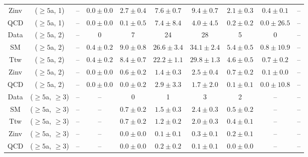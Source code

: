 \begin{table}[h!]
{\begin{tabular}{cccccccccc}
	Zinv & ($\ge5$a, 1) & -- & $0.0\pm 0.0$ & $2.7\pm 0.4$ & $7.6\pm 0.7$ & $9.4\pm 0.7$ & $2.1\pm 0.3$ & $0.4\pm 0.1$ & -- \\[0.5ex] 
	QCD & ($\ge5$a, 1) & -- & $0.0\pm 0.0$ & $0.1\pm 0.5$ & $7.4\pm 8.4$ & $4.0\pm 4.5$ & $0.2\pm 0.2$ & $0.0\pm 26.5$ & -- \\[0.5ex] 
	Data & ($\ge5$a, 2) & -- & 0 & 7 & 24 & 28 & 5 & 0 & -- \\[0.5ex] 
	SM & ($\ge5$a, 2) & -- & $0.4\pm 0.2$ & $9.0\pm 0.8$ & $26.6\pm 3.4$ & $34.1\pm 2.4$ & $5.4\pm 0.5$ & $0.8\pm 10.9$ & -- \\[0.5ex] 
	Ttw & ($\ge5$a, 2) & -- & $0.4\pm 0.2$ & $8.4\pm 0.7$ & $22.2\pm 1.1$ & $29.8\pm 1.3$ & $4.6\pm 0.5$ & $0.7\pm 0.2$ & -- \\[0.5ex] 
	Zinv & ($\ge5$a, 2) & -- & $0.0\pm 0.0$ & $0.6\pm 0.2$ & $1.4\pm 0.3$ & $2.5\pm 0.4$ & $0.7\pm 0.2$ & $0.1\pm 0.0$ & -- \\[0.5ex] 
	QCD & ($\ge5$a, 2) & -- & $0.0\pm 0.0$ & $0.0\pm 0.2$ & $2.9\pm 3.3$ & $1.7\pm 2.0$ & $0.1\pm 0.1$ & $0.0\pm 10.8$ & -- \\[0.5ex] 
	Data & ($\ge5$a, $\ge3$) & -- & -- & 0 & 1 & 3 & 2 & -- & -- \\[0.5ex] 
	SM & ($\ge5$a, $\ge3$) & -- & -- & $0.7\pm 0.2$ & $1.5\pm 0.3$ & $2.4\pm 0.3$ & $0.5\pm 0.2$ & -- & -- \\[0.5ex] 
	Ttw & ($\ge5$a, $\ge3$) & -- & -- & $0.7\pm 0.2$ & $1.2\pm 0.2$ & $2.0\pm 0.3$ & $0.4\pm 0.1$ & -- & -- \\[0.5ex] 
	Zinv & ($\ge5$a, $\ge3$) & -- & -- & $0.0\pm 0.0$ & $0.1\pm 0.1$ & $0.3\pm 0.1$ & $0.2\pm 0.1$ & -- & -- \\[0.5ex] 
	QCD & ($\ge5$a, $\ge3$) & -- & -- & $0.0\pm 0.0$ & $0.2\pm 0.2$ & $0.1\pm 0.1$ & $0.0\pm 0.0$ & -- & -- \\[0.5ex] 
	\hline
	\hline
\end{tabular}}
\end{table}
